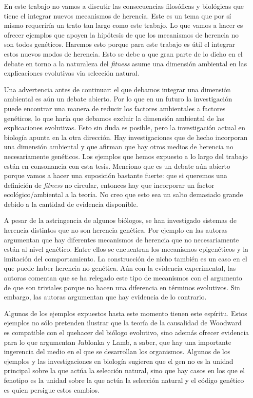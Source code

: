 En este trabajo no vamos a discutir las consecuencias filosóficas y biológicas que tiene el integrar nuevos mecanismos de herencia. Este es un tema que por sí mismo requeriría un trato tan largo como este trabajo. Lo que vamos a hacer es ofrecer ejemplos que apoyen la hipótesis de que los mecanismos de herencia no son todos genéticos. Haremos esto porque para este trabajo es útil el integrar estos nuevos modos de herencia. Esto se debe a que gran parte de lo dicho en el debate en torno a la naturaleza del \emph{fitness} asume una dimensión ambiental en las explicaciones evolutivas via selección natural.

Una advertencia antes de continuar: el que debamos integrar una dimensión ambiental es aún un debate abierto. Por lo que en un futuro la investigación puede encontrar una manera de reducir los factores ambientales a factores genéticos, lo que haría que debamos excluir la dimensión ambiental de las explicaciones evolutivas. Esto sin duda es posible, pero la investigación actual en biología apunta en la otra dirección. Hay investigaciones que de hecho incorporan una dimensión ambiental y que afirman que hay otros medios de herencia no necesariamente genéticos. Los ejemplos que hemos expuesto a lo largo del trabajo están en consonancia con esta tesis. Menciono que es un debate aún abierto porque vamos a hacer una suposición bastante fuerte: que si queremos una definición de \emph{fitness} no circular, entonces hay que incorporar un factor ecológico/ambiental a la teoría. No creo que esto sea un salto demasiado grande debido a la cantidad de evidencia disponible.

A pesar de la astringencia de algunos biólogos, se han investigado sistemas de herencia distintos que no son herencia genética. Por ejemplo en \cite{Jablonka2020} las autoras argumentan que hay diferentes mecanismos de herencia que no necesariamente están al nivel genético. Entre ellos se encuentran los mecanismos epigenéticos y la imitación del comportamiento. La construcción de nicho también es un caso en el que puede haber herencia no genética. Aún con la evidencia experimental, las autoras comentan que se ha relegado este tipo de mecanismos con el argumento de que son triviales porque no hacen una diferencia en términos evolutivos. Sin embargo, las autoras argumentan que hay evidencia de lo contrario.

Algunos de los ejemplos expuestos hasta este momento tienen este espíritu. Estos ejemplos no sólo pretenden ilustrar que la teoría de la causalidad de Woodward es compatible con el quehacer del biólogo evolutivo, sino además ofrecer evidencia para lo que argumentan Jablonka y Lamb, a saber, que hay una importante ingerencia del medio en el que se desarrollan los organismos. Algunos de los ejemplos y las investigaciones en biología sugieren que el gen no es la unidad principal sobre la que actúa la selección natural, sino que hay casos en los que el fenotipo es la unidad sobre la que actúa la selección natural y el código genético es quien persigue estos cambios.

